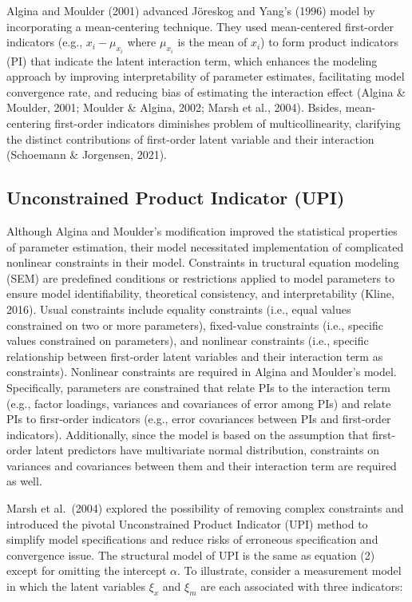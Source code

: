\documentclass[
  man]{apa7}
\begin{document}
Algina and Moulder (2001) advanced Jöreskog and Yang's (1996) model by incorporating a mean-centering technique. They used mean-centered first-order indicators (e.g., \(x_{i} - \mu_{x_{i}}\) where \(\mu_{x_{i}}\) is the mean of \(x_{i}\)) to form product indicators (PI) that indicate the latent interaction term, which enhances the modeling approach by improving interpretability of parameter estimates, facilitating model convergence rate, and reducing bias of estimating the interaction effect (Algina \& Moulder, 2001; Moulder \& Algina, 2002; Marsh et al., 2004). Bsides, mean-centering first-order indicators diminishes problem of multicollinearity, clarifying the distinct contributions of first-order latent variable and their interaction (Schoemann \& Jorgensen, 2021).

\hypertarget{unconstrained-product-indicator-upi}{%
\subsection{Unconstrained Product Indicator (UPI)}\label{unconstrained-product-indicator-upi}}

Although Algina and Moulder's modification improved the statistical properties of parameter estimation, their model necessitated implementation of complicated nonlinear constraints in their model. Constraints in tructural equation modeling (SEM) are predefined conditions or restrictions applied to model parameters to ensure model identifiability, theoretical consistency, and interpretability (Kline, 2016). Usual constraints include equality constraints (i.e., equal values constrained on two or more parameters), fixed-value constraints (i.e., specific values constrained on parameters), and nonlinear constraints (i.e., specific relationship between first-order latent variables and their interaction term as constraints). Nonlinear constraints are required in Algina and Moulder's model. Specifically, parameters are constrained that relate PIs to the interaction term (e.g., factor loadings, variances and covariances of error among PIs) and relate PIs to firsr-order indicators (e.g., error covariances between PIs and first-order indicators). Additionally, since the model is based on the assumption that first-order latent predictors have multivariate normal distribution, constraints on variances and covariances between them and their interaction term are required as well.

Marsh et al.~(2004) explored the possibility of removing complex constraints and introduced the pivotal Unconstrained Product Indicator (UPI) method to simplify model specifications and reduce risks of erroneous specification and convergence issue. The structural model of UPI is the same as equation (2) except for omitting the intercept \(\alpha\). To illustrate, consider a measurement model in which the latent variables \(\xi_{x}\) and \(\xi_{m}\) are each associated with three indicators:
\end{document}
